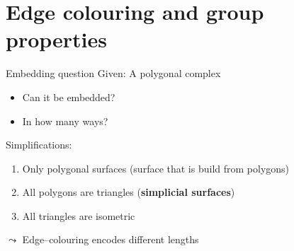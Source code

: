 \documentclass[11pt, handout]{beamer}
\begin{document}
            
\section{Edge colouring and group properties}
\newcommand{\colA}{blue}
\newcommand{\colB}{red}
\newcommand{\colC}{green!80!black}
\newcommand{\width}{very thick}
\frame{\tableofcontents[currentsection]}


\begin{frame}{Embedding question}
    \pause
    Given: A polygonal complex
    \begin{itemize}
        \pause
        \item Can it be embedded?
        \pause
        \item In how many ways?
    \end{itemize}
    \pause
    Simplifications:
    \begin{enumerate}
        \pause
        \item Only polygonal surfaces (surface that is build from polygons)
        \pause
        \item All polygons are triangles (\textbf{simplicial surfaces})
        \pause
        \item All triangles are isometric
    \end{enumerate}
    \pause
    $\leadsto$ Edge--colouring encodes different lengths
            \begin{center}
            \end{center}
\end{frame}
\end{document}
